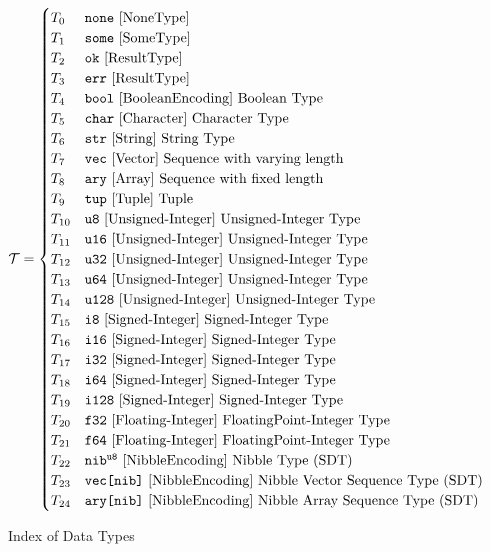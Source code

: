 \documentclass[../alan-handbook.tex]{subfiles}
\begin{document}
\begin{figure}
\label{IndexOfDataTypes}
\caption*{Index of Data Types}
\begin{equation*}
    \mathcal{T} = \begin{cases} 
    T_0 & \texttt{none} \ \ref{NoneType} \\ 
    T_1 & \texttt{some} \ \ref{SomeType} \\
    T_2 & \texttt{ok} \ \ref{ResultType} \\ 
    T_3 & \texttt{err} \ \ref{ResultType} \\ 
    T_4 & \texttt{bool} \ \ref{BooleanEncoding} \ \text{Boolean Type}\\
    T_5 & \texttt{char} \ \ref{Character} \ \text{Character Type}\\
    T_6 & \texttt{str} \ \ref{String} \ \text{String Type}\\
    T_7 & \texttt{vec} \ \ref{Vector} \ \text{Sequence with varying length} \\
    T_8 & \texttt{ary} \ \ref{Array} \ \text{Sequence with fixed length} \\
    T_9 & \texttt{tup} \ \ref{Tuple} \ \text{Tuple} \\
    T_{10} & \texttt{u8} \ \ref{Unsigned-Integer} \ \text{Unsigned-Integer Type}\\
    T_{11} & \texttt{u16} \ \ref{Unsigned-Integer} \ \text{Unsigned-Integer Type} \\ 
    T_{12} & \texttt{u32} \ \ref{Unsigned-Integer} \ \text{Unsigned-Integer Type} \\ 
    T_{13} & \texttt{u64} \ \ref{Unsigned-Integer} \ \text{Unsigned-Integer Type} \\
    T_{14} & \texttt{u128} \ \ref{Unsigned-Integer} \ \text{Unsigned-Integer Type}\\ 
    T_{15} & \texttt{i8} \ \ref{Signed-Integer} \ \text{Signed-Integer Type}\\
    T_{16} & \texttt{i16} \ \ref{Signed-Integer} \ \text{Signed-Integer Type}\\ 
    T_{17} & \texttt{i32} \ \ref{Signed-Integer} \ \text{Signed-Integer Type}\\ 
    T_{18} & \texttt{i64} \ \ref{Signed-Integer} \ \text{Signed-Integer Type}\\
    T_{19} & \texttt{i128} \ \ref{Signed-Integer} \ \text{Signed-Integer Type} \\
    T_{20} & \texttt{f32} \ \ref{Floating-Integer} \ \text{FloatingPoint-Integer Type} \\
    T_{21} & \texttt{f64} \ \ref{Floating-Integer} \ \text{FloatingPoint-Integer Type} \\
    T_{22} & \texttt{nib$^{\texttt{u8}}$} \ \ref{NibbleEncoding} \ \text{Nibble Type (SDT)}\\
    T_{23} & \texttt{vec[nib]} \ \ref{NibbleEncoding} \ \text{Nibble Vector Sequence Type (SDT)} \\
    T_{24} & \texttt{ary[nib]} \ \ref{NibbleEncoding} \ \text{Nibble Array Sequence Type (SDT)}
\end{cases}
\end{equation*}
\end{figure}
\end{document}

